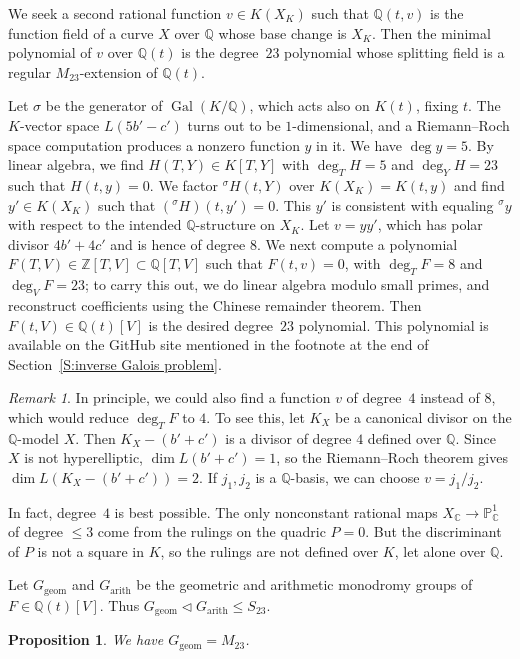 \documentclass[12pt,reqno]{amsart}
\newcommand{\C}{\mathbb{C}}
\newcommand{\PP}{\mathbb{P}}
\newcommand{\Q}{\mathbb{Q}}
\newcommand{\Z}{\mathbb{Z}}
\DeclareMathOperator{\Gal}{Gal}
\newcommand{\arith}{\mathrm{arith}}
\newcommand{\geom}{\mathrm{geom}}
\newtheorem{proposition}[theorem]{Proposition}
\theoremstyle{definition}
\theoremstyle{remark}
\newtheorem{remark}[theorem]{Remark}
\begin{document}
We seek a second rational function $v \in K(X_K)$ such that $\Q(t,v)$ is the function field of a curve $X$ over $\Q$ whose base change is $X_K$.
Then the minimal polynomial of $v$ over $\Q(t)$ is the degree~$23$ polynomial whose splitting field is a regular $M_{23}$-extension of $\Q(t)$.

Let $\sigma$ be the generator of $\Gal(K/\Q)$, which acts also on $K(t)$, fixing $t$.
The $K$-vector space $L(5 b'-c')$ turns out to be $1$-dimensional, and a Riemann--Roch space computation produces a nonzero function $y$ in it.
We have $\deg y = 5$.
By linear algebra, we find $H(T,Y) \in K[T,Y]$ with $\deg_T H = 5$ and $\deg_Y H = 23$
such that $H(t,y)=0$.
We factor ${}^\sigma\! H(t,Y)$ over $K(X_K) = K(t,y)$ and find $y' \in K(X_K)$ such that $({}^\sigma\! H)(t, y')=0$.
This $y'$ is consistent with equaling ${}^\sigma \! y$ with respect to the intended $\Q$-structure on $X_K$.
Let $v=yy'$, which has polar divisor $4b'+4c'$ and is hence of degree $8$.
We next compute a polynomial $F(T,V) \in \Z[T,V] \subset \Q[T,V]$
such that $F(t,v)=0$, with $\deg_T F = 8$ and $\deg_V F = 23$;
to carry this out, we do linear algebra modulo small primes, and reconstruct coefficients using the Chinese remainder theorem.
Then $F(t,V) \in \Q(t)[V]$ is the desired degree~$23$ polynomial.
This polynomial is available on the GitHub site mentioned in the footnote at the end of Section~\ref{S:inverse Galois problem}.

\begin{remark}
In principle, we could also find a function $v$ of degree~$4$ instead of $8$,
which would reduce $\deg_T F$ to $4$.
To see this, let $K_X$ be a canonical divisor on the $\Q$-model $X$.
Then $K_X-(b'+c')$ is a divisor of degree $4$ defined over $\Q$.
Since $X$ is not hyperelliptic, $\dim L(b'+c')=1$,
so the Riemann--Roch theorem gives $\dim L(K_X-(b'+c'))=2$.
If $j_1,j_2$ is a $\Q$-basis, we can choose $v=j_1/j_2$.

In fact, degree~$4$ is best possible.
The only nonconstant rational maps $X_\C \to \PP^1_\C$ of degree $\le 3$ come from the rulings on the quadric $P=0$.
But the discriminant of $P$ is not a square in $K$,
so the rulings are not defined over $K$, let alone over $\Q$.
\end{remark}

Let $G_\geom$ and $G_\arith$ be the geometric and arithmetic monodromy groups of $F \in \Q(t)[V]$.
Thus $G_\geom \lhd G_\arith \le S_{23}$.

\begin{proposition} \label{PgeoM}
We have $G_\geom = M_{23}$. 
\end{proposition}
\end{document}
